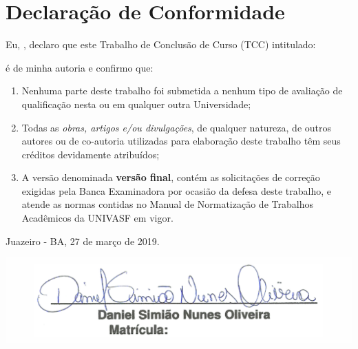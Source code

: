 \chapter*{Declaração de Conformidade}

\noindent Eu, \MakeUppercase{\textbf{\imprimirautor}}, declaro que este Trabalho de Conclusão de Curso (TCC) intitulado:

\begin{center}
    \MakeUppercase{\textbf{\imprimirtitulo}}
\end{center}

\noindent é de minha autoria e confirmo que:

\begin{enumerate}
    \item Nenhuma parte deste trabalho foi submetida a nenhum tipo de avaliação de qualificação nesta ou em qualquer outra Universidade;

    \item Todas as \textit{obras, artigos e/ou divulgações}, de qualquer natureza, de outros autores ou de co-autoria utilizadas para elaboração deste trabalho têm seus créditos devidamente atribuídos;

    \item A versão denominada \textbf{versão final}, contém as solicitações de correção exigidas pela Banca Examinadora por ocasião da defesa deste trabalho, e atende as normas contidas no Manual de Normatização de Trabalhos Acadêmicos da UNIVASF em vigor.
\end{enumerate}

\vspace{1cm}

\begin{center}
    Juazeiro - BA, 27 de março de 2019.
\end{center}

\begin{center}
	\includegraphics[scale=1]{Digitalizado/assinaturaAluno.png}
\end{center}

\newpage